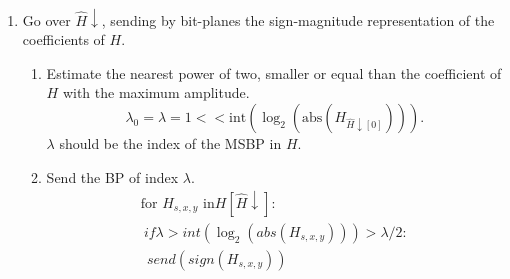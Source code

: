 \begin{enumerate}
\item Go over $\hat{H}\downarrow$, sending by bit-planes the
  sign-magnitude representation of the coefficients of $H$.

  \begin{enumerate}

  \item Estimate the nearest power of two, smaller or equal than the
    coefficient of $H$ with the maximum amplitude.
    \begin{equation}
      \lambda_0 = \lambda = 1 << \text{int}(\log_2(\text{abs}(H_{\hat{H}\downarrow[0]}))).
    \end{equation}
    $\lambda$ should be the index of the MSBP in $H$.
    
  \item Send the BP of index $\lambda$.
    \begin{equation}
      \begin{array}{l}
        \text{for~}H_{s,x,y}\text{~in} H[\hat{H}\downarrow]: \\
        ~ if \lambda > int(\log_2(abs(H_{s,x,y}))) > \lambda/2: \\
        ~~ send(sign(H_{s,x,y}))\\
        ~ 
      \end{array}
    \end{equation}
  \end{enumerate}
\end{enumerate}
  
